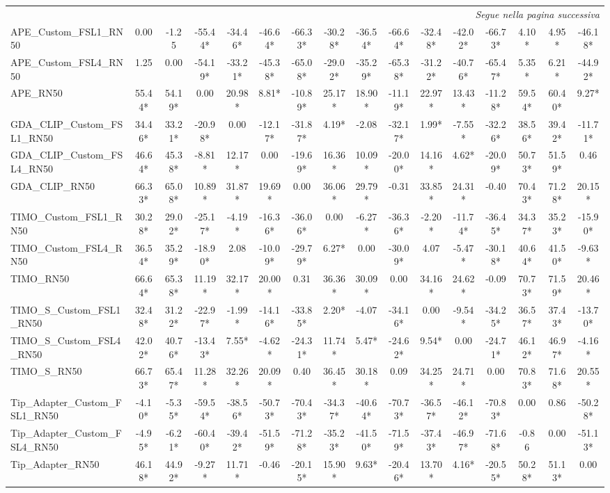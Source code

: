 \begin{scriptsize}
\begin{longtable}{l|ccccccccccccccc}
\midrule
\endhead
\midrule
\multicolumn{16}{r}{\textit{Segue nella pagina successiva}} \\
\endfoot
\bottomrule
\endlastfoot
APE\_Custom\_FSL1\_RN50 & 0.00 & -1.25 & -55.44* & -34.46* & -46.64* & -66.33* & -30.28* & -36.54* & -66.64* & -32.48* & -42.02* & -66.73* & 4.10* & 4.95* & -46.18* \\
APE\_Custom\_FSL4\_RN50 & 1.25 & 0.00 & -54.19* & -33.21* & -45.38* & -65.08* & -29.02* & -35.29* & -65.38* & -31.22* & -40.76* & -65.47* & 5.35* & 6.21* & -44.92* \\
APE\_RN50 & 55.44* & 54.19* & 0.00 & 20.98* & 8.81* & -10.89* & 25.17* & 18.90* & -11.19* & 22.97* & 13.43* & -11.28* & 59.54* & 60.40* & 9.27* \\
GDA\_CLIP\_Custom\_FSL1\_RN50 & 34.46* & 33.21* & -20.98* & 0.00 & -12.17* & -31.87* & 4.19* & -2.08 & -32.17* & 1.99* & -7.55* & -32.26* & 38.56* & 39.42* & -11.71* \\
GDA\_CLIP\_Custom\_FSL4\_RN50 & 46.64* & 45.38* & -8.81* & 12.17* & 0.00 & -19.69* & 16.36* & 10.09* & -20.00* & 14.16* & 4.62* & -20.09* & 50.73* & 51.59* & 0.46 \\
GDA\_CLIP\_RN50 & 66.33* & 65.08* & 10.89* & 31.87* & 19.69* & 0.00 & 36.06* & 29.79* & -0.31 & 33.85* & 24.31* & -0.40 & 70.43* & 71.28* & 20.15* \\
TIMO\_Custom\_FSL1\_RN50 & 30.28* & 29.02* & -25.17* & -4.19* & -16.36* & -36.06* & 0.00 & -6.27* & -36.36* & -2.20* & -11.74* & -36.45* & 34.37* & 35.23* & -15.90* \\
TIMO\_Custom\_FSL4\_RN50 & 36.54* & 35.29* & -18.90* & 2.08 & -10.09* & -29.79* & 6.27* & 0.00 & -30.09* & 4.07 & -5.47* & -30.18* & 40.64* & 41.50* & -9.63* \\
TIMO\_RN50 & 66.64* & 65.38* & 11.19* & 32.17* & 20.00* & 0.31 & 36.36* & 30.09* & 0.00 & 34.16* & 24.62* & -0.09 & 70.73* & 71.59* & 20.46* \\
TIMO\_S\_Custom\_FSL1\_RN50 & 32.48* & 31.22* & -22.97* & -1.99* & -14.16* & -33.85* & 2.20* & -4.07 & -34.16* & 0.00 & -9.54* & -34.25* & 36.57* & 37.43* & -13.70* \\
TIMO\_S\_Custom\_FSL4\_RN50 & 42.02* & 40.76* & -13.43* & 7.55* & -4.62* & -24.31* & 11.74* & 5.47* & -24.62* & 9.54* & 0.00 & -24.71* & 46.12* & 46.97* & -4.16* \\
TIMO\_S\_RN50 & 66.73* & 65.47* & 11.28* & 32.26* & 20.09* & 0.40 & 36.45* & 30.18* & 0.09 & 34.25* & 24.71* & 0.00 & 70.83* & 71.68* & 20.55* \\
Tip\_Adapter\_Custom\_FSL1\_RN50 & -4.10* & -5.35* & -59.54* & -38.56* & -50.73* & -70.43* & -34.37* & -40.64* & -70.73* & -36.57* & -46.12* & -70.83* & 0.00 & 0.86 & -50.28* \\
Tip\_Adapter\_Custom\_FSL4\_RN50 & -4.95* & -6.21* & -60.40* & -39.42* & -51.59* & -71.28* & -35.23* & -41.50* & -71.59* & -37.43* & -46.97* & -71.68* & -0.86 & 0.00 & -51.13* \\
Tip\_Adapter\_RN50 & 46.18* & 44.92* & -9.27* & 11.71* & -0.46 & -20.15* & 15.90* & 9.63* & -20.46* & 13.70* & 4.16* & -20.55* & 50.28* & 51.13* & 0.00 \\
\end{longtable}
\end{scriptsize}
